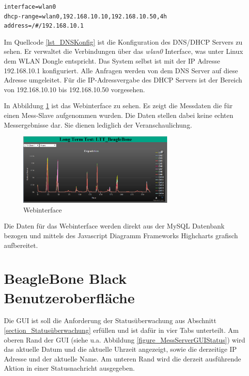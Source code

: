 \begin{lstlisting}[caption={DHCP/DNS Konfiguration},label=lst_DNSKonfig]
interface=wlan0
dhcp-range=wlan0,192.168.10.10,192.168.10.50,4h
address=/#/192.168.10.1
\end{lstlisting}

Im Quellcode \ref{lst_DNSKonfig} ist die Konfiguration des DNS/DHCP Servers zu sehen. Er verwaltet die Verbindungen über das \textit{wlan0} Interface, was unter Linux dem WLAN Dongle entspricht. Das System selbst ist mit der IP Adresse 192.168.10.1 konfiguriert. Alle Anfragen werden von dem DNS Server auf diese Adresse umgeleitet. Für die IP-Adressvergabe des DHCP Servers ist der Bereich von 192.168.10.10 bis 192.168.10.50 vorgesehen. 


In Abbildung \ref{figure_Webinterface} ist das Webinterface zu sehen. Es zeigt die Messdaten die für einen Mess-Slave aufgenommen wurden. Die Daten stellen dabei keine echten Messergebnisse dar. Sie dienen lediglich der Veranschaulichung.

\begin{figure}[H]
\begin{center}
\includegraphics[width=0.7\textwidth ]{img/general/Webinterface.png}
\caption{Webinterface}
\label{figure_Webinterface}
\end{center}
\end{figure}

Die Daten für das Webinterface werden direkt aus der MySQL Datenbank bezogen und mittels des Javascript Diagramm Frameworks Highcharts \cite{highcharts} grafisch aufbereitet.

\newpage
\section{BeagleBone Black Benutzeroberfläche }
Die \ac{GUI} ist soll die Anforderung der Statusüberwachung aus Abschnitt \ref{section_Statusüberwachung} erfüllen und ist dafür in vier Tabs unterteilt. Am oberen Rand der \ac{GUI} (siehe u.a. Abbildung \ref{figure_MessServerGUIStatus}) wird das aktuelle Datum und die aktuelle Uhrzeit angezeigt, sowie die derzeitige IP Adresse und der aktuelle Name. Am unteren Rand wird die derzeit ausführende Aktion in einer Statusnachricht ausgegeben.

